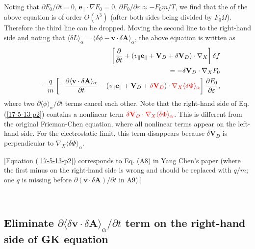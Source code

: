 \documentclass{article}
\newcommand{\tmcolor}[2]{{\color{#1}{#2}}}
\begin{document}
Noting that $\partial F_0 / \partial t = 0$, $\mathbf{e}_{\parallel} \cdot
\nabla F_0 = 0$, $\partial F_0 / \partial \varepsilon \approx - F_0 m / T$, we
find that the \tmcolor{blue}{third line} of the above equation is of order $O
(\lambda^3)$ (after both sides being divided by $F_0 \Omega$). Therefore the
third line can be dropped. Moving the second line to the right-hand side and
noting that $\langle \delta L \rangle_{\alpha} = \langle \delta \phi
-\mathbf{v} \cdot \delta \mathbf{A} \rangle_{\alpha}$, the above equation is
written as
\begin{eqnarray}
  &  & \left[ \frac{\partial}{\partial t} + (v_{\parallel}
  \mathbf{e}_{\parallel} +\mathbf{V}_D + \delta \mathbf{V}_D) \cdot \nabla_X
  \right] \delta f \nonumber\\
  &  & = - \delta \mathbf{V}_D \cdot \nabla_X F_0 \nonumber\\
  &  & - \frac{q}{m} \left[ - \frac{\partial \langle \mathbf{v} \cdot \delta
  \mathbf{A} \rangle_{\alpha}}{\partial t} - (v_{\parallel}
  \mathbf{e}_{\parallel} +\mathbf{V}_D + \tmcolor{red}{\delta \mathbf{V}_D})
  \cdot \tmcolor{red}{\nabla_X \langle \delta \Phi \rangle_{\alpha}} \right]
  \frac{\partial F_0}{\partial \varepsilon},  \label{17-5-13-p2}
\end{eqnarray}
where two $\partial \langle \phi \rangle_{\alpha} / \partial t$ terms cancel
each other. Note that the right-hand side of Eq. (\ref{17-5-13-p2}) contains a
nonlinear term $\tmcolor{red}{\delta \mathbf{V}_D \cdot \nabla_X \langle
\delta \Phi \rangle_{\alpha}}$. This is different from the original
Frieman-Chen equation, where all nonlinear terms appear on the left-hand side.
For the electrostatic limit, this term disappears because $\delta
\mathbf{V}_D$ is perpendicular to $\nabla_X \langle \delta \Phi
\rangle_{\alpha}$.

[Equation (\ref{17-5-13-p2}) corresponds to Eq. (A8) in Yang Chen's
paper{\cite{ychen2009}} (where the first minus on the right-hand side is wrong
and should be replaced with $q / m$; one $q$ is missing before $\partial
(\mathbf{v} \cdot \delta \mathbf{A}) / \partial t$ in A9).]

\

\subsection{Eliminate $\partial \langle \delta \mathbf{v} \cdot \delta
\mathbf{A} \rangle_{\alpha} / \partial t$ term on the right-hand side of GK
equation}\label{24-3-21-p1}
\end{document}
